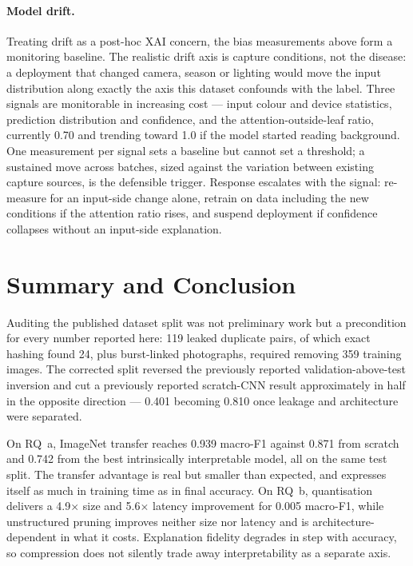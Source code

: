 \documentclass[sigconf,nonacm]{acmart}
\begin{document}
\paragraph{Model drift.} Treating drift as a post-hoc XAI concern, the bias
measurements above form a monitoring baseline. The realistic drift axis is
capture conditions, not the disease: a deployment that changed camera, season or
lighting would move the input distribution along exactly the axis this dataset
confounds with the label. Three signals are monitorable in increasing cost ---
input colour and device statistics, prediction distribution and confidence, and
the attention-outside-leaf ratio, currently 0.70 and trending toward 1.0 if the
model started reading background. One measurement per signal sets a baseline but
cannot set a threshold; a sustained move across batches, sized against the
variation between existing capture sources, is the defensible trigger. Response
escalates with the signal: re-measure for an input-side change alone, retrain on
data including the new conditions if the attention ratio rises, and suspend
deployment if confidence collapses without an input-side explanation.

\section{Summary and Conclusion}

Auditing the published dataset split was not preliminary work but a precondition
for every number reported here: 119 leaked duplicate pairs, of which exact
hashing found 24, plus burst-linked photographs, required removing 359 training
images. The corrected split reversed the previously reported
validation-above-test inversion and cut a previously reported scratch-CNN result
approximately in half in the opposite direction --- 0.401 becoming 0.810 once
leakage and architecture were separated.

On RQ~a, ImageNet transfer reaches 0.939 macro-F1 against 0.871 from scratch and
0.742 from the best intrinsically interpretable model, all on the same test
split. The transfer advantage is real but smaller than expected, and expresses
itself as much in training time as in final accuracy. On RQ~b, quantisation
delivers a 4.9$\times$ size and 5.6$\times$ latency improvement for 0.005
macro-F1, while unstructured pruning improves neither size nor latency and is
architecture-dependent in what it costs. Explanation fidelity degrades in step
with accuracy, so compression does not silently trade away interpretability as a
separate axis.
\end{document}
